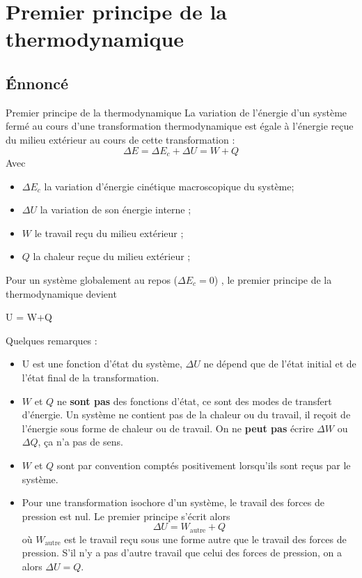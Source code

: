 \documentclass{cours}
\begin{document}
\section{Premier principe de la thermodynamique}%
\label{sec:premier_principe_de_la_thermodynamique}

\subsection{Énnoncé}%
\label{sub:ennonce}

\begin{loi}{Premier principe de la thermodynamique}
 La variation de l'énergie d'un système fermé au cours d'une transformation thermodynamique est égale à l'énergie reçue du milieu extérieur au cours de cette transformation : 
 \begin{equation}
   \Delta E = \Delta E_c + \Delta U = W + Q
 \end{equation}
 Avec
 \begin{itemize}
   \item $\Delta E_c$ la variation d'énergie cinétique macroscopique du système;
   \item $\Delta U$ la variation de son énergie interne ;
   \item $W$ le travail reçu du milieu extérieur ;
   \item $Q$ la chaleur reçue du milieu extérieur ;
 \end{itemize}
\end{loi}
  
Pour un système globalement au repos ($\Delta E_c=0$) , le premier principe de la thermodynamique devient
\begin{eqencadre}
  \Delta U = W+Q
  \label{eq:premier_principe}
\end{eqencadre}
Quelques remarques :
\begin{itemize}
  \item U est une fonction d'état du système, $\Delta U$ ne dépend que de l'état initial et de l'état final de la transformation.
  \item $W$ et $Q$ ne \textbf{sont pas} des fonctions d'état, ce sont des modes de transfert d'énergie. Un système ne contient pas de la chaleur ou du travail, il reçoit de l'énergie sous forme de chaleur ou de travail. On ne \textbf{peut pas} écrire $\Delta W$ ou $\Delta Q$, ça n'a pas de sens.
  \item $W$ et $Q$ sont par convention comptés positivement lorsqu'ils sont reçus par le système.
  \item Pour une transformation isochore d'un système, le travail des forces de pression est nul. Le premier principe s'écrit alors
  \begin{equation}
    \Delta U  = W_\text{autre}+Q
  \end{equation}
  où $W_\text{autre}$ est le travail reçu sous une forme autre que le travail des forces de pression. S'il n'y a pas d'autre travail que celui des forces de pression, on a alors $\Delta U = Q$. 
\end{itemize}
\end{document}

